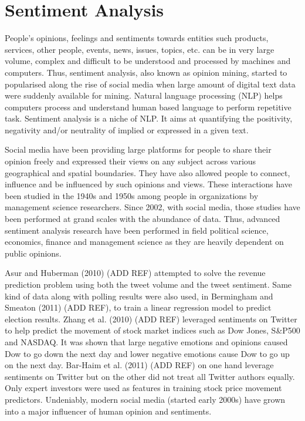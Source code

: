\chapter{Sentiment Analysis}
People's opinions, feelings and sentiments towards entities such products, services, other people, events, news, issues, topics, etc. can be in very large volume, complex and difficult to be understood and processed by machines and computers. Thus, sentiment analysis, also known as opinion mining, started to popularised along the rise of social media when large amount of digital text data were suddenly available for mining. Natural language processing (NLP) helps computers process and understand human based language to perform repetitive task. Sentiment analysis is a niche of NLP. It aims at quantifying the positivity, negativity and/or neutrality of implied or expressed in a given text.

Social media have been providing large platforms for people to share their opinion freely and expressed their views on any subject across various geographical and spatial  boundaries. They have also allowed people to connect, influence and be influenced by such opinions and views. These interactions have been studied in the 1940s and 1950s among people in organizations by management science researchers. Since 2002, with social media, those studies have been performed at grand scales with the abundance of data. Thus, advanced sentiment analysis research have been performed in field political science, economics, finance and management science as they are heavily dependent on public opinions. 

Asur and Huberman (2010) (ADD REF) attempted to solve the revenue prediction problem using both the tweet volume and the tweet sentiment. Same kind of data along with polling results were also used, in Bermingham and Smeaton (2011) (ADD REF), to train a linear regression model to predict election results. Zhang et al. (2010) (ADD REF) leveraged sentiments on Twitter to help predict the movement of stock market indices such as Dow Jones, S\&P500 and NASDAQ. It was shown that large negative emotions and opinions caused Dow to go down the next day and lower negative emotions cause Dow to go up on the next day. Bar-Haim et al. (2011) (ADD REF) on one hand leverage sentiments on Twitter but on the other did not treat all Twitter authors equally. Only expert investors were used as features in training stock price movement predictors. Undeniably, modern social media (started early 2000s) have grown into a major influencer of human opinion and sentiments.

